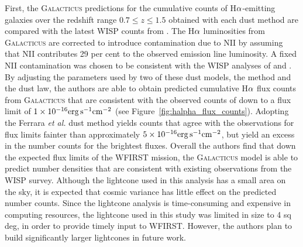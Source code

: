 First, the \textsc{Galacticus} predictions for the cumulative counts of H${\rm
\alpha}$-emitting galaxies over the redshift range $0.7\leqslant z\leqslant 1.5$
obtained with each dust method are compared with the latest WISP counts from
\citet{Mehta2015}. The H${\rm \alpha}$ luminosities from \textsc{Galacticus} are
corrected to introduce contamination due to NII by assuming that NII contributes
29 per cent to the observed emission line luminosity. A fixed NII contamination
was chosen to be consistent with the WISP analyses of \citet{Colbert13} and
\citet{Mehta2015}. By adjusting the parameters used by two of these dust models,
the \citet{Charlot00} method and the \citet{Calzetti00} dust law, the authors
are able to obtain predicted cumulative H${\rm \alpha}$ flux counts from
\textsc{Galacticus} that are consistent with the observed counts of \citet{Mehta2015} down to a flux limit of $1\times 10^{-16}{\rm
erg}\,{\rm s}^{-1}{\rm cm}^{-2}$ (see Figure~\ref{fig:halpha_flux_counts}).
Adopting the Ferrara \textit{et al.} \citet{Ferrara99} dust method yields counts
that agree with the observations for flux limits fainter than approximately
$5\times 10^{-16}{\rm erg}\,{\rm s}^{-1}{\rm cm}^{-2}$, but yield an excess in
the number counts for the brightest fluxes. Overall the authors find that down
the expected flux limits of the WFIRST mission, the \textsc{Galacticus} model is
able to predict number densities that are consistent with existing observations
from the WISP survey. Although the lightcone used in this analysis has a small
area on the sky, it is expected that cosmic variance has little effect on the
predicted number counts. Since the lightcone analysis is time-consuming and
expensive in computing resources, the lightcone used in this study was limited
in size to 4 sq deg, in order to provide timely input to WFIRST. However, the
authors plan to build significantly larger lightcones in future work.

